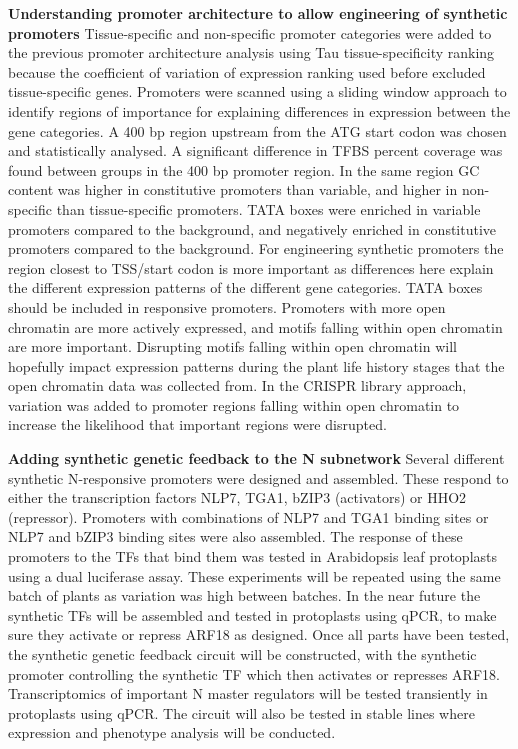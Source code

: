 \documentclass[../main.tex]{subfiles}
\begin{document}
\textbf{Understanding promoter architecture to allow engineering of synthetic promoters}
Tissue-specific and non-specific promoter categories were added to the previous promoter architecture analysis using Tau tissue-specificity ranking because the coefficient of variation of expression ranking used before excluded tissue-specific genes. Promoters were scanned using a sliding window approach to identify regions of importance for explaining differences in expression between the gene categories. A 400 bp region upstream from the ATG start codon was chosen and statistically analysed. A significant difference in TFBS percent coverage was found between groups in the 400 bp promoter region. In the same region GC content was higher in constitutive promoters than variable, and higher in non-specific than tissue-specific promoters. TATA boxes were enriched in variable promoters compared to the background, and negatively enriched in constitutive promoters compared to the background.
For engineering synthetic promoters the region closest to TSS/start codon is more important as differences here explain the different expression patterns of the different gene categories. TATA boxes should be included in responsive promoters. Promoters with more open chromatin are more actively expressed, and motifs falling within open chromatin are more important. Disrupting motifs falling within open chromatin will hopefully impact expression patterns during the plant life history stages that the open chromatin data was collected from. In the CRISPR library approach, variation was added to promoter regions falling within open chromatin to increase the likelihood that important regions were disrupted.

\textbf{Adding synthetic genetic feedback to the N subnetwork}
Several different synthetic N-responsive promoters were designed and assembled. These respond to either the transcription factors NLP7, TGA1, bZIP3 (activators) or HHO2 (repressor). Promoters with combinations of NLP7 and TGA1 binding sites or NLP7 and bZIP3 binding sites were also assembled. The response of these promoters to the TFs that bind them was tested in Arabidopsis leaf protoplasts using a dual luciferase assay. These experiments will be repeated using the same batch of plants as variation was high between batches. In the near future the synthetic TFs will be assembled and tested in protoplasts using qPCR, to make sure they activate or repress ARF18 as designed. Once all parts have been tested, the synthetic genetic feedback circuit will be constructed, with the synthetic promoter controlling the synthetic TF which then activates or represses ARF18. Transcriptomics of important N master regulators will be tested transiently in protoplasts using qPCR. The circuit will also be tested in stable lines where expression and phenotype analysis will be conducted.
\end{document}
